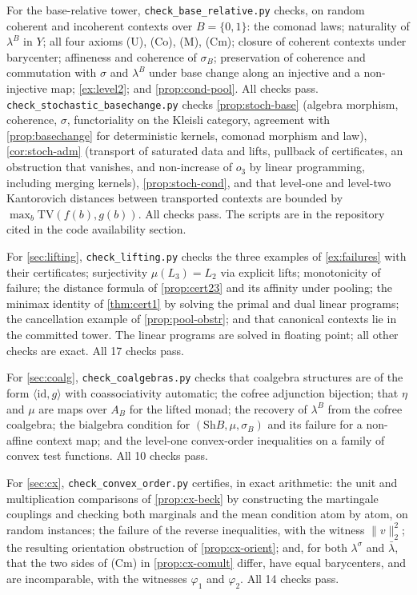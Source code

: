 \documentclass[11pt]{article}
\theoremstyle{definition}
\theoremstyle{remark}
\newcommand{\Sh}{\mathrm{Sh}}
\newcommand{\id}{\mathrm{id}}
\newcommand{\lb}{\bar\lambda}
\newcommand{\ls}{\lambda^{\sigma}}
\begin{document}
For the base-relative tower, \texttt{check\_base\_relative.py} checks, on random coherent and
incoherent contexts over $B=\{0,1\}$: the comonad laws; naturality of $\lambda^B$ in $Y$; all four
axioms (U), (Co), (M), (Cm); closure of coherent contexts under barycenter; affineness and coherence
of $\sigma_B$; preservation of coherence and commutation with $\sigma$ and $\lambda^B$ under base change
along an injective and a non-injective map; \cref{ex:level2}; and \cref{prop:cond-pool}. All checks
pass. \texttt{check\_stochastic\allowbreak\_basechange.py} checks \cref{prop:stoch-base} (algebra
morphism, coherence, $\sigma$, functoriality on the Kleisli category, agreement with
\cref{prop:basechange} for deterministic kernels, comonad morphism and law),
\cref{cor:stoch-adm} (transport of saturated data and lifts, pullback of certificates, an obstruction
that vanishes, and non-increase of $o_3$ by linear programming, including merging kernels),
\cref{prop:stoch-cond}, and that level-one and level-two Kantorovich distances between transported
contexts are bounded by $\max_b\mathrm{TV}(f(b),g(b))$. All checks pass. The scripts are in the repository cited in the code availability section.

For \cref{sec:lifting}, \texttt{check\_lifting.py} checks the three examples of
\cref{ex:failures} with their certificates; surjectivity $\mu(L_3)=L_2$ via explicit lifts;
monotonicity of failure; the distance formula of \cref{prop:cert23} and its affinity under pooling;
the minimax identity of \cref{thm:cert1} by solving the primal and dual linear programs; the
cancellation example of \cref{prop:pool-obstr}; and that canonical contexts lie in the committed
tower. The linear programs are solved in floating point; all other checks are exact. All 17 checks
pass.

For \cref{sec:coalg}, \texttt{check\_coalgebras.py} checks that coalgebra structures are of the form
$\langle\id,g\rangle$ with coassociativity automatic; the cofree adjunction bijection; that $\eta$ and
$\mu$ are maps over $A_B$ for the lifted monad; the recovery of $\lambda^B$ from the cofree coalgebra;
the bialgebra condition for $(\Sh B,\mu,\sigma_B)$ and its failure for a non-affine context map; and
the level-one convex-order inequalities on a family of convex test functions. All 10 checks pass.

For \cref{sec:cx}, \texttt{check\_convex\_order.py} certifies, in exact arithmetic: the unit and
multiplication comparisons of \cref{prop:cx-beck} by constructing the martingale couplings and checking
both marginals and the mean condition atom by atom, on random instances; the failure of the reverse
inequalities, with the witness $\lVert v\rVert_2^2$; the resulting orientation obstruction of
\cref{prop:cx-orient}; and, for both $\ls$ and $\lb$, that the two sides of (Cm) in
\cref{prop:cx-comult} differ, have equal barycenters, and are incomparable, with the witnesses
$\varphi_1$ and $\varphi_2$. All 14 checks pass.
\end{document}
